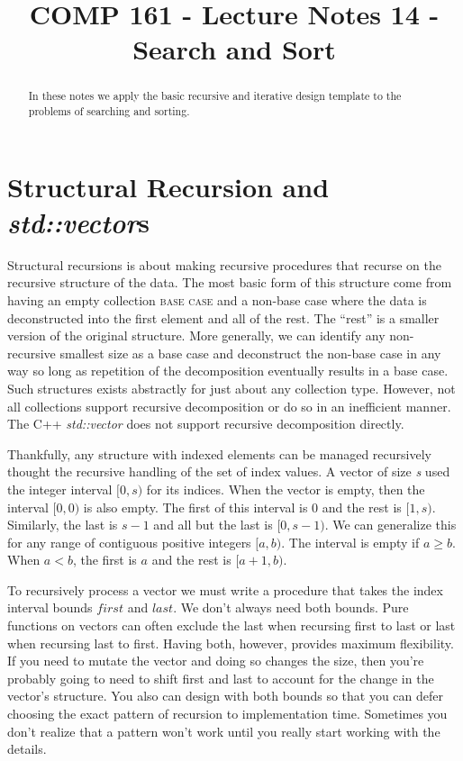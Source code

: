 \documentclass[]{tufte-handout}
\title{COMP 161 - Lecture Notes 14 - Search and Sort}
\date{}
\begin{document}
 
\maketitle

\begin{abstract}
In these notes we apply the basic recursive and iterative design template to the problems of searching and sorting. 
\end{abstract}

\section{Structural Recursion and \textit{std::vector}s}

Structural recursions is about making recursive procedures that recurse on the recursive structure of the data. The most basic form of this structure come from having an empty collection \textsc{base case} and a non-base case where the data is deconstructed into the first element and all of the rest. The ``rest'' is a smaller version of the original structure. More generally, we can identify any non-recursive smallest size as a base case and deconstruct the non-base case in any way so long as repetition of the decomposition eventually results in a base case. Such structures exists abstractly for just about any collection type.  However, not all collections support recursive decomposition or do so in an inefficient manner. The C++ \textit{std::vector} does not support recursive decomposition directly. 

Thankfully, any structure with indexed elements can be managed recursively thought the recursive handling of the set of index values. A vector of size \textit{s} used the integer interval $[0,s)$ for its indices. When the vector is empty, then the interval $[0,0)$ is also empty\sidenote{$[a,b)$ is empty if $a \geq b$}. The first of this interval is $0$ and the rest is $[1,s)$. Similarly, the last is $s-1$ and all but the last is $[0,s-1)$. We can generalize this for any range of contiguous positive integers $[a,b)$. The interval is empty if $a \geq b$. When $a < b$, the first is $a$ and the rest is $[a+1,b)$.

To recursively process a vector we must write a procedure that takes the index interval bounds $first$ and $last$.  We don't always need both bounds. Pure functions on vectors can often exclude the last when recursing first to last or last when recursing last to first.  Having both, however, provides maximum flexibility.  If you need to mutate the vector and doing so changes the size, then you're probably going to need to shift first and last to account for the change in the vector's structure. You also can design with both bounds so that you can defer choosing the exact pattern of recursion to implementation time. Sometimes you don't realize that a pattern won't work until you really start working with the details. 
\end{document}
